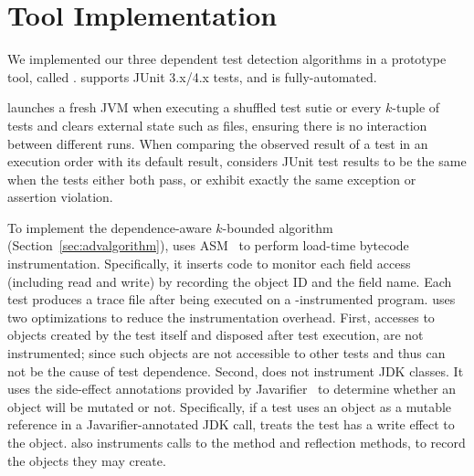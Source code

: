 \section{Tool Implementation}
\label{sec:impl}


We implemented our three dependent test detection algorithms in
a prototype tool, called \ourtool. \ourtool
supports JUnit 3.x/4.x tests, and is fully-automated.

\ourtool launches a fresh JVM when
executing a shuffled test sutie or every
$k$-tuple of tests and clears external state such
as files, ensuring there is no interaction between
different runs. When comparing the observed result of
a test in an execution order with its default result,
\ourtool considers JUnit test results to be the same when the
tests either both pass, or exhibit exactly the same exception
or assertion violation.

 

To implement the dependence-aware $k$-bounded algorithm (Section~\ref{sec:advalgorithm}),
\ourtool uses ASM~\cite{asm} to perform load-time bytecode
instrumentation. Specifically, it inserts code to monitor each
field access (including read and write) by recording the
object ID and the field name. Each test produces a trace file after being
executed on a \ourtool-instrumented program.
\ourtool uses two optimizations to reduce the
instrumentation overhead. First, accesses to objects
created by the test itself and disposed
after test execution, are not instrumented; since such 
objects are not accessible to other tests and thus can not
be the cause of test dependence. Second,
\ourtool does not instrument JDK classes. It uses the side-effect
annotations provided by Javarifier~\cite{QuinonezTE2008} to 
determine whether an object will be mutated or not.
Specifically, if a test uses an object as a mutable reference
in a Javarifier-annotated JDK call, \ourtool treats the test
has a write effect to the object.
\ourtool also instruments
calls to the  method and reflection
methods, to record the objects they may create.


